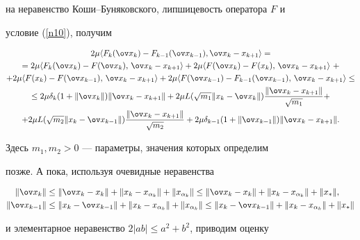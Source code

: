 \begin{pf}
на неравенство Коши--Буняковского, липшицевость оператора $F$ и


условие (\ref{n10}), получим


\begin{multline}\label{n8} 


2\mu \lft F_k(\ov x_k)-F_{k-1}(\ov x_{k-1}) ,


\ov x_k-x_{k+1} \rgt =\\


= 2\mu \lft F_k(\ov x_k)-F(\ov x_k),\,


\ov x_k-x_{k+1} \rgt+ 2\mu \lft F(\ov x_k)-F(x_k),\,


\ov x_k-x_{k+1} \rgt\ +\\


+ 2\mu \lft F(x_k)-F(\ov x_{k-1}),\,


\ov x_k-x_{k+1} \rgt


+ 2\mu \lft F(\ov x_{k-1})- F_{k-1}(\ov x_{k-1}),\,


\ov x_k-x_{k+1} \rgt\leq\\


\leq


2\mu\dk(1+\|\ov x_k\|)\Ax + 2\mu L(\sqrt{m_1}


\Bx) \frac{\Ax}{\sqrt{m_1}} + \\


+ 2\mu L(\sqrt{m_2}\Cx)\frac{\Ax}{\sqrt{m_2}}


+ 2\mu \dkk(1+\|\ov x_{k-1}\|)\Ax.


\end{multline}


Здесь $m_1,m_2>0$ --- параметры, значения которых определим


позже. А пока, используя очевидные неравенства


\begin{equation}\label{n12}


\begin{split}


\|\ov x_k\|&\leq \| \ov x_k-x_k \| + \D+\|\xak\| \leq 


\| \ov x_k-x_k \| + \D+\|x_*\|,\\


\|\ov x_{k-1}\| &\leq \Cx+\D+\|\xak\| \leq 


\Cx+\D+\|x_*\|


\end{split}


\end{equation}


и элементарное неравенство $2|ab|\leq a^2+b^2$, приводим оценку



\end{pf}
